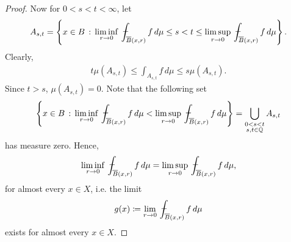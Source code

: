 \documentclass[11pt]{book}
\theoremstyle{definition}
\numberwithin{equation}{chapter}
\def\avint{\,\ThisStyle{\ensurestackMath{%
  \stackinset{c}{.2\LMpt}{c}{1\LMpt}{\SavedStyle-}{\SavedStyle\phantom{\int}}}%
  \setbox0=\hbox{$\SavedStyle\int\,$}\kern-\wd0}\int}
\begin{document}
\begin{proof}
Now for $0 < s < t < \infty$, let 
\begin{align*}
    A_{s,t} = \left\{x \in B \,:\, \liminf_{r \to 0} \avint_{\overline{B}(x,r)} f\,d\mu \leq s < t \leq  \limsup_{r \to 0} \avint_{\overline{B}(x,r)} f\,d\mu \right\}.
\end{align*}
Clearly,
\begin{align*}
    t \mu(A_{s,t}) \leq \int_{A_{s,t}} f\,d\mu \leq s \mu(A_{s,t}).
\end{align*}
Since $t > s$, $\mu(A_{s,t}) = 0$. Note that the following set 
\begin{align*}
    \left\{x \in B \,:\, \liminf_{r \to 0} \avint_{\overline{B}(x,r)} f\,d\mu < \limsup_{r \to 0} \avint_{\overline{B}(x,r)} f\,d\mu \right\} = \bigcup_{\substack{0 < s < t\\ s,t \in \mathbb{Q}}} A_{s,t}
\end{align*}
has measure zero. Hence, 
\begin{align*}
    \liminf_{r \to 0} \avint_{\overline{B}(x,r)} f\,d\mu = \limsup_{r \to 0} \avint_{\overline{B}(x,r)} f\,d\mu,
\end{align*}
for almost every $x \in X$, i.e. the limit
\begin{align}\label{theorem_61_equ1}
    g(x) \coloneqq \lim_{r \to 0} \avint_{\overline{B}(x,r)} f\,d\mu
\end{align}
exists for almost every $x \in X$.


\end{proof}
\end{document}

